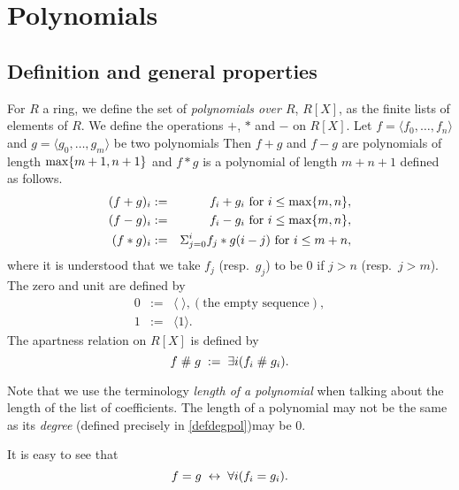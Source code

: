 \section{Polynomials}

\subsection{Definition and general properties}
\begin{definition}
For $R$ a ring, we define the set of {\em polynomials over $R$},
$R[X]$, as the finite lists of elements of $R$. We define the operations $+$,
$*$ and $-$  on $R[X]$. Let $f= \langle f_0, \ldots,
f_n\rangle $ and $g= \langle g_0, \ldots, g_m\rangle $ be two
polynomials 
Then $f+g$ and $f-g$ are polynomials of length $\mbox{max}\{ m+1,n+1\}$ and
$f*g$ is a polynomial of length $m+n+1$ defined as follows.
\begin{eqnarray*}
  (f+g)_i &:=& f_i + g_i \mbox{ for } i \leq \mbox{max}\{ m,n\},\\
  (f-g)_i &:=& f_i - g_i \mbox{ for } i \leq \mbox{max}\{ m,n\},\\
  (f*g)_i &:=& \Sigma_{j=0}^i f_j * g(i-j) \mbox{ for } i \leq m+n,
\end{eqnarray*}
where it is understood that we take $f_j$ (resp.\ $g_j$) to be $0$ if
$j>n$ (resp.\ $j>m$). The zero and unit are defined by
\begin{eqnarray*}
  0 &:=& \langle\; \rangle, (\mbox{the empty sequence}),\\
  1&:=&\langle 1\rangle.
\end{eqnarray*}
The apartness relation on $R[X]$ is defined by
$$ f \mathrel{\#} g \; := \; \exists i(f_i \mathrel{\#} g_i).$$
\end{definition}

Note that we use the terminology {\em length of a polynomial\/} when
talking about the length of the list of coefficients. The length of a
polynomial may not be the same as its {\em degree} (defined
precisely in \ref{defdegpol})may be $0$.

It is easy to see that
$$ f =g \; \leftrightarrow \; \forall i(f_i = g_i).$$


